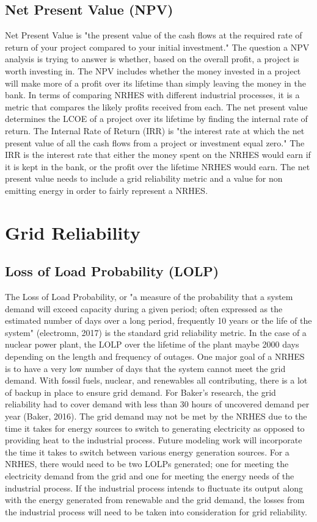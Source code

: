 \documentclass[12pt]{UIdahoMastersThesis}
\begin{document}
\subsection{Net Present Value (NPV)}
Net Present Value is "the present value of the cash flows at the required rate of return of your project compared to your initial investment." The question a NPV analysis is trying to answer is whether, based on the overall profit, a project is worth investing in.  The NPV includes whether the money invested in a project will make more of a profit over its lifetime than simply leaving the money in the bank.  In terms of comparing NRHES with different industrial processes, it is a metric that compares the likely profits received from each.  The net present value determines the LCOE of a project over its lifetime by finding the internal rate of return.  The Internal Rate of Return (IRR) is "the interest rate at which the net present value of all the cash flows from a project or investment equal zero."  The IRR is the interest rate that either the money spent on the NRHES would earn if it is kept in the bank, or the profit over the lifetime NRHES would earn.  The net present value needs to include a grid reliability metric and a value for non emitting energy in order to fairly represent a NRHES.

\section{Grid Reliability}
\subsection{Loss of Load Probability (LOLP)}
The Loss of Load Probability, or "a measure of the probability that a system demand will exceed capacity during a given period; often expressed as the estimated number of days over a long period, frequently 10 years or the life of the system" (electromn, 2017) is the standard grid reliability metric.  In the case of a nuclear power plant, the LOLP over the lifetime of the plant maybe 2000 days depending on the length and frequency of outages. One major goal of a NRHES is to have a very low number of days that the system cannot meet the grid demand.  With fossil fuels, nuclear, and renewables all contributing, there is a lot of backup in place to ensure grid demand. For Baker's research, the grid reliability had to cover demand with less than 30 hours of uncovered demand per year (Baker, 2016).  The grid demand may not be met by the NRHES due to the time it takes for energy sources to switch to generating electricity as opposed to providing heat to the industrial process. Future modeling work will incorporate the time it takes to switch between various energy generation sources.
For a NRHES, there would need to be two LOLPs generated; one for meeting the electricity demand from the grid and one for meeting the energy needs of the industrial process.  If the industrial process intends to fluctuate its output along with the energy generated from renewable and the grid demand, the losses from the industrial process will need to be taken into consideration for grid reliability.
\end{document}

